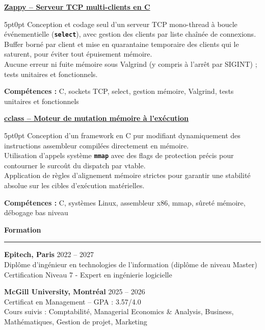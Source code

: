 \documentclass[9pt]{extarticle}
\begin{document}
\underline{\bfseries Zappy -- Serveur TCP multi-clients en C}
\par
\begin{adjustwidth}{5pt}{0pt}
    Conception et codage seul d'un serveur TCP mono-thread à boucle événementielle ({\bfseries \texttt{select}}), avec gestion des clients par liste chaînée de connexions. \\
    Buffer borné par client et mise en quarantaine temporaire des clients qui le saturent, pour éviter tout épuisement mémoire. \\
    Aucune erreur ni fuite mémoire sous Valgrind (y compris à l'arrêt par SIGINT) ; tests unitaires et fonctionnels.
\end{adjustwidth}
\par
{\bfseries Compétences :} C, sockets TCP, select, gestion mémoire, Valgrind, tests unitaires et fonctionnels

\par\vspace{8pt}

\underline{\bfseries \href{https://github.com/paulogarithm/cclass}{cclass} -- Moteur de mutation mémoire à l'exécution}
\par
\begin{adjustwidth}{5pt}{0pt}
    Conception d'un framework en C pur modifiant dynamiquement des instructions assembleur compilées directement en mémoire. \\
    Utilisation d'appels système {\bfseries \texttt{mmap}} avec des flags de protection précis pour contourner le surcoût du dispatch par vtable. \\
    Application de règles d'alignement mémoire strictes pour garantir une stabilité absolue sur les cibles d'exécution matérielles.
\end{adjustwidth}
\par
{\bfseries Compétences :} C, systèmes Linux, assembleur x86, mmap, sûreté mémoire, débogage bas niveau

\par\vspace{8pt}

{\large\bfseries Formation}
\par\vspace{-8pt}
\rule{\linewidth}{0.4pt}
\par\vspace{5pt}

{\bfseries Epitech, Paris} \hfill 2022 -- 2027 \\
Diplôme d'ingénieur en technologies de l'information (diplôme de niveau Master) \\
Certification Niveau 7 - Expert en ingénierie logicielle

\vspace{6pt}

{\bfseries McGill University, Montréal} \hfill 2025 -- 2026 \\
Certificat en Management -- GPA : 3.57/4.0 \\
Cours suivis : Comptabilité, Managerial Economics \& Analysis, Business, Mathématiques, Gestion de projet, Marketing
\end{document}
